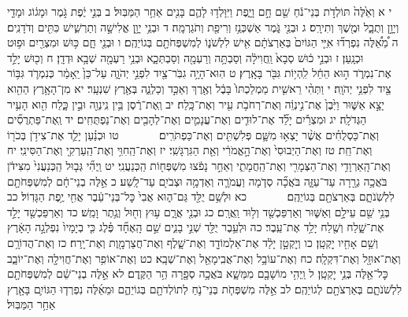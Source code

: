 \documentclass[twoside, openany, parskip=half, 11pt]{book}
\begin{document}
י א וְאֵ֙לֶּה֙ תּוֹלְדֹ֣ת בְּנֵי־נֹ֔חַ שֵׁ֖ם חָ֣ם וָיָ֑פֶת וַיִּוָּלְד֥וּ לָהֶ֛ם בָּנִ֖ים אַחַ֥ר הַמַּבּֽוּל׃ ב בְּנֵ֣י יֶ֔פֶת גֹּ֣מֶר וּמָג֔וֹג וּמָדַ֖י וְיָוָ֣ן וְתֻבָ֑ל וּמֶ֖שֶׁךְ וְתִירָֽס׃ ג וּבְנֵ֖י גֹּ֑מֶר אַשְׁכְּנַ֥ז וְרִיפַ֖ת וְתֹגַרְמָֽה׃ ד וּבְנֵ֥י יָוָ֖ן אֱלִישָׁ֣ה וְתַרְשִׁ֑ישׁ כִּתִּ֖ים וְדֹדָנִֽים׃ ה מֵ֠אֵ֠לֶּה נִפְרְד֞וּ אִיֵּ֤י הַגּוֹיִם֙ בְּאַרְצֹתָ֔ם אִ֖ישׁ לִלְשֹׁנ֑וֹ לְמִשְׁפְּחֹתָ֖ם בְּגוֹיֵהֶֽם׃ ו וּבְנֵ֖י חָ֑ם כּ֥וּשׁ וּמִצְרַ֖יִם וּפ֥וּט וּכְנָֽעַן׃ ז וּבְנֵ֣י כ֔וּשׁ סְבָא֙ וַֽחֲוִילָ֔ה וְסַבְתָּ֥ה וְרַעְמָ֖ה וְסַבְתְּכָ֑א וּבְנֵ֥י רַעְמָ֖ה שְׁבָ֥א וּדְדָֽן׃ ח וְכ֖וּשׁ יָלַ֣ד אֶת־נִמְרֹ֑ד ה֣וּא הֵחֵ֔ל לִֽהְי֥וֹת גִּבֹּ֖ר בָּאָֽרֶץ׃ ט הֽוּא־הָיָ֥ה גִבֹּֽר־צַ֖יִד לִפְנֵ֣י יְהֹוָ֑ה עַל־כֵּן֙ יֵֽאָמַ֔ר כְּנִמְרֹ֛ד גִּבּ֥וֹר צַ֖יִד לִפְנֵ֥י יְהֹוָֽה׃ י וַתְּהִ֨י רֵאשִׁ֤ית מַמְלַכְתּוֹ֙ בָּבֶ֔ל וְאֶ֖רֶךְ וְאַכַּ֣ד וְכַלְנֵ֑ה בְּאֶ֖רֶץ שִׁנְעָֽר׃ יא מִן־הָאָ֥רֶץ הַהִ֖וא יָצָ֣א אַשּׁ֑וּר וַיִּ֙בֶן֙ אֶת־נִ֣ינְוֵ֔ה וְאֶת־רְחֹבֹ֥ת עִ֖יר וְאֶת־כָּֽלַח׃ יב וְֽאֶת־רֶ֔סֶן בֵּ֥ין נִֽינְוֵ֖ה וּבֵ֣ין כָּ֑לַח הִ֖וא הָעִ֥יר הַגְּדֹלָֽה׃ יג וּמִצְרַ֡יִם יָלַ֞ד אֶת־לוּדִ֧ים וְאֶת־עֲנָמִ֛ים וְאֶת־לְהָבִ֖ים וְאֶת־נַפְתֻּחִֽים׃ יד וְֽאֶת־פַּתְרֻסִ֞ים וְאֶת־כַּסְלֻחִ֗ים אֲשֶׁ֨ר יָצְא֥וּ מִשָּׁ֛ם פְּלִשְׁתִּ֖ים וְאֶת־כַּפְתֹּרִֽים׃
　　　 טו וּכְנַ֗עַן יָלַ֛ד אֶת־צִידֹ֥ן בְּכֹר֖וֹ וְאֶת־חֵֽת׃ טז וְאֶת־הַיְבוּסִי֙ וְאֶת־הָ֣אֱמֹרִ֔י וְאֵ֖ת הַגִּרְגָּשִֽׁי׃ יז וְאֶת־הַֽחִוִּ֥י וְאֶת־הַֽעַרְקִ֖י וְאֶת־הַסִּינִֽי׃ יח וְאֶת־הָֽאַרְוָדִ֥י וְאֶת־הַצְּמָרִ֖י וְאֶת־הַֽחֲמָתִ֑י וְאַחַ֣ר נָפֹ֔צוּ מִשְׁפְּח֖וֹת הַֽכְּנַעֲנִֽי׃ יט וַֽיְהִ֞י גְּב֤וּל הַֽכְּנַעֲנִי֙ מִצִּידֹ֔ן בֹּאֲכָ֥ה גְרָ֖רָה עַד־עַזָּ֑ה בֹּאֲכָ֞ה סְדֹ֧מָה וַעֲמֹרָ֛ה וְאַדְמָ֥ה וּצְבֹיִ֖ם עַד־לָֽשַׁע׃ כ אֵ֣לֶּה בְנֵי־חָ֔ם לְמִשְׁפְּחֹתָ֖ם לִלְשֹֽׁנֹתָ֑ם בְּאַרְצֹתָ֖ם בְּגוֹיֵהֶֽם׃
　　　 כא וּלְשֵׁ֥ם יֻלַּ֖ד גַּם־ה֑וּא אֲבִי֙ כׇּל־בְּנֵי־עֵ֔בֶר אֲחִ֖י יֶ֥פֶת הַגָּדֽוֹל׃ כב בְּנֵ֥י שֵׁ֖ם עֵילָ֣ם וְאַשּׁ֑וּר וְאַרְפַּכְשַׁ֖ד וְל֥וּד וַֽאֲרָֽם׃ כג וּבְנֵ֖י אֲרָ֑ם ע֥וּץ וְח֖וּל וְגֶ֥תֶר וָמַֽשׁ׃ כד וְאַרְפַּכְשַׁ֖ד יָלַ֣ד אֶת־שָׁ֑לַח וְשֶׁ֖לַח יָלַ֥ד אֶת־עֵֽבֶר׃ כה וּלְעֵ֥בֶר יֻלַּ֖ד שְׁנֵ֣י בָנִ֑ים שֵׁ֣ם הָֽאֶחָ֞ד פֶּ֗לֶג כִּ֤י בְיָמָיו֙ נִפְלְגָ֣ה הָאָ֔רֶץ וְשֵׁ֥ם אָחִ֖יו יׇקְטָֽן׃ כו וְיׇקְטָ֣ן יָלַ֔ד אֶת־אַלְמוֹדָ֖ד וְאֶת־שָׁ֑לֶף וְאֶת־חֲצַרְמָ֖וֶת וְאֶת־יָֽרַח׃ כז וְאֶת־הֲדוֹרָ֥ם וְאֶת־אוּזָ֖ל וְאֶת־דִּקְלָֽה׃ כח וְאֶת־עוֹבָ֥ל וְאֶת־אֲבִֽימָאֵ֖ל וְאֶת־שְׁבָֽא׃ כט וְאֶת־אוֹפִ֥ר וְאֶת־חֲוִילָ֖ה וְאֶת־יוֹבָ֑ב כׇּל־אֵ֖לֶּה בְּנֵ֥י יׇקְטָֽן׃ ל וַֽיְהִ֥י מוֹשָׁבָ֖ם מִמֵּשָׁ֑א בֹּאֲכָ֥ה סְפָ֖רָה הַ֥ר הַקֶּֽדֶם׃ לא אֵ֣לֶּה בְנֵי־שֵׁ֔ם לְמִשְׁפְּחֹתָ֖ם לִלְשֹׁנֹתָ֑ם בְּאַרְצֹתָ֖ם לְגוֹיֵהֶֽם׃ לב אֵ֣לֶּה מִשְׁפְּחֹ֧ת בְּנֵי־נֹ֛חַ לְתוֹלְדֹתָ֖ם בְּגוֹיֵהֶ֑ם וּמֵאֵ֜לֶּה נִפְרְד֧וּ הַגּוֹיִ֛ם בָּאָ֖רֶץ אַחַ֥ר הַמַּבּֽוּל׃
\end{document}
